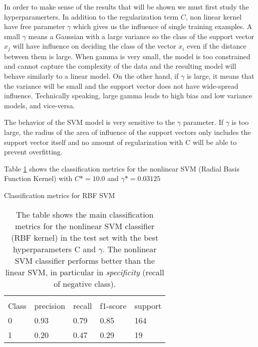\documentclass[11pt]{article}
\theoremstyle{definition}
\theoremstyle{remark}
\begin{document}
In order to make sense of the results that will be shown we must first study the hyperparamerters. In addition to the regularization term $C$, non linear kernel have free parameter $\gamma$ which gives us the influence of single training examples. A small $\gamma$ means a Gaussian with a large variance so the class of the support vector $x_j$ will have influence on deciding the class of the vector $x_i$ even if the distance between them is large. 
When gamma is very small, the model is too constrained and cannot capture the complexity of the data and the resulting model will behave similarly to a linear model.
On the other hand, if $\gamma$ is large, it means that the  variance will be small and the support vector does not have wide-spread influence. Technically speaking, large gamma leads to high bias and low variance models, and vice-versa. 


The behavior of the SVM model is very sensitive to the $\gamma$ parameter. If $\gamma$ is too large, the radius of the area of influence of the support vectors only includes the support vector itself and no amount of regularization with C will be able to prevent overfitting.

Table \ref{tab:svmnonlinear} shows the classification metrics for the nonlinear SVM (Radial Basis Function Kernel) with $C*= 10.0$ and $\gamma *= 0.03125$

\begin{table}[H]
\caption{Classification metrics for RBF SVM} 
\begin{center} 
\begin{tabular}{lllll}
\hline
\multicolumn{1}{c}{} \\
Class & precision & recall & f1-score & support     \\
\hline
0 & 0.93  &    0.79   &   0.85   &    164 \\
1 & 0.20  &    0.47   &   0.29   &    19 \\
\hline
\end{tabular}
\caption{The table shows the main classification metrics for the nonlinear SVM classifier (RBF kernel) in the test set with the best hyperparameters C and $\gamma$. The nonlinear SVM classifier performs better than the linear SVM, in particular in \emph{specificity} (recall of negative class).} \label{tab:svmnonlinear} 
\end{center}
\end{table}
\end{document}
